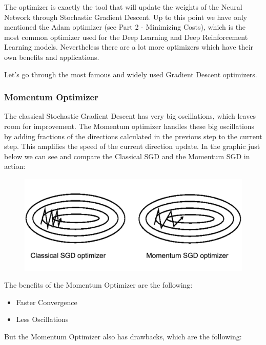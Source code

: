 \documentclass[]{book}
\begin{document}
The optimizer is exactly the tool that will update the weights of the Neural Network through Stochastic Gradient Descent. Up to this point we have only mentioned the Adam optimizer (see Part 2 - Minimizing Costs), which is the most common optimizer used for the Deep Learning and Deep Reinforcement Learning models. Nevertheless there are a lot more optimizers which have their own benefits and applications.

Let's go through the most famous and widely used Gradient Descent optimizers.

\newpage

\subsubsection{Momentum Optimizer}

The classical Stochastic Gradient Descent has very big oscillations, which leaves room for improvement. The Momentum optimizer handles these big oscillations by adding fractions of the directions calculated in the previous step to the current step. This amplifies the speed of the current direction update. In the graphic just below we can see and compare the Classical SGD and the Momentum SGD in action:

\begin{figure}[!htbp]
        \begin{center}
            \includegraphics[scale=0.75]{ANN_32.png}
        \end{center}
\end{figure}

The benefits of the Momentum Optimizer are the following:

\begin{itemize}
    \item Faster Convergence
    \item Less Oscillations
\end{itemize}

But the Momentum Optimizer also has drawbacks, which are the following:
\end{document}
